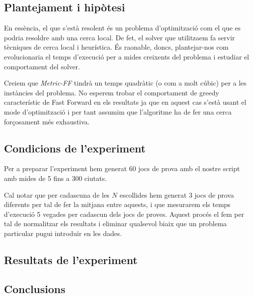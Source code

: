 \documentclass[11pt,a4paper]{article}
\begin{document}
\subsection{Plantejament i hipòtesi}

En essència, el que s'està resolent és un problema d'optimització com el que es podria resoldre amb una cerca local. De fet, el solver que utilitzaem fa servir tècniques de cerca local i heurística. És raonable, doncs, plantejar-nos com evolucionaria el temps d'execució per a mides creixents del problema i estudiar el comportament del solver. 

Creiem que \emph{Metric-FF} tindrà un temps quadràtic (o com a molt cúbic) per a les instàncies del problema. No esperem trobar el comportament de greedy característic de Fast Forward en els resultats ja que en aquest cas s'està usant el mode d'optimització i per tant assumim que l'algoritme ha de fer una cerca forçosament més exhaustiva.

\subsection{Condicions de l'experiment}

Per a preparar l'experiment hem generat 60 jocs de prova amb el nostre script amb mides de 5 fins a 300 ciutats. 

Cal notar que per cadascuna de les $N$ escollides hem generat 3 jocs de prova diferents per tal de fer la mitjana entre aquests, i que mesurarem els temps d'execució 5 vegades per cadascun dels jocs de proves. Aquest procés el fem per tal de normalitzar els resultats i eliminar qualsevol biaix que un problema particular pugui introduïr en les dades.

\subsection{Resultats de l'experiment}



\subsection{Conclusions}
\end{document}
